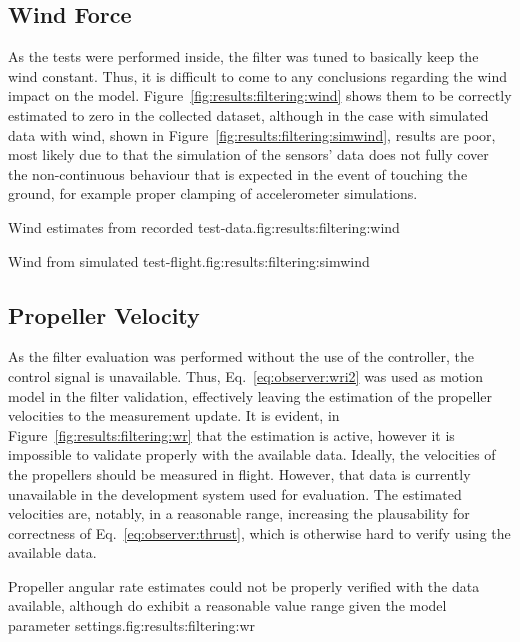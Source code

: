 \subsection{Wind Force}
    As the tests were performed inside, the filter was tuned to basically keep the
    wind constant. Thus, it is difficult to come to any conclusions regarding the
    wind impact on the model. Figure~\ref{fig:results:filtering:wind}
    shows them to be correctly estimated to zero in the collected dataset,
    although in the case with simulated data with wind, shown in Figure~\ref{fig:results:filtering:simwind},
    results are poor, most likely due to that the simulation of the sensors' data
    does not fully cover the non-continuous behaviour that is expected in the
    event of touching the ground, for example proper clamping of accelerometer simulations.

    \begin{subfigures}{Wind estimates from recorded test-data.}{fig:results:filtering:wind}
    \end{subfigures}

    \begin{subfigures}{Wind from simulated test-flight.}{fig:results:filtering:simwind}
    \end{subfigures}


\subsection{Propeller Velocity}
    As the filter evaluation was performed without the use of the controller,
    the control signal is unavailable. Thus, Eq.~\ref{eq:observer:wri2} was used as
    motion model in the filter validation, effectively leaving the estimation of the propeller velocities
    to the measurement update. It is evident, in Figure~\ref{fig:results:filtering:wr}
    that the estimation is active, however it is impossible to validate properly with the available data.
    Ideally, the velocities of the propellers should be measured in flight.
    However, that data is currently unavailable in the development system used for evaluation.
    The estimated velocities are, notably, in a reasonable range,
    increasing the plausability for correctness of Eq.~\ref{eq:observer:thrust}, which is
    otherwise hard to verify using the available data.

    \begin{subfigures}{Propeller angular rate estimates could not be properly verified with the data available, although do exhibit a reasonable value range given the model parameter settings.}{fig:results:filtering:wr}
    \end{subfigures}
